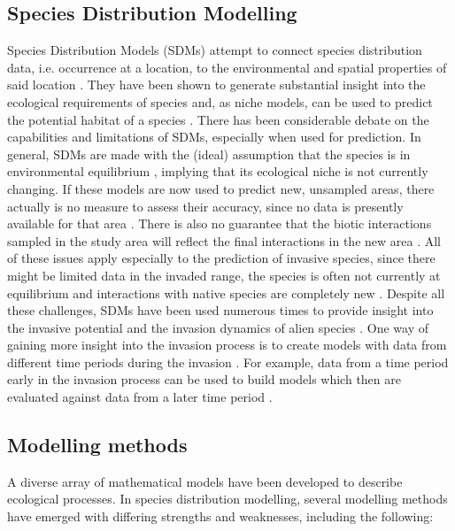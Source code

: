\documentclass[12pt,a4paper]{article}
\begin{document}
\subsection{Species Distribution Modelling}
Species Distribution Models (SDMs) attempt to connect species distribution data, i.e. occurrence at a location, to the environmental and spatial properties of said location \cite{elith2009sdmtheory}.
They have been shown to generate substantial insight into the ecological requirements of species and, as niche models, can be used to predict the potential habitat of a species \cite{araujo2006sdmchallenges}.
There has been considerable debate on the capabilities and limitations of SDMs, especially when used for prediction.
In general, SDMs are made with the (ideal) assumption that the species is in environmental equilibrium \cite{elith2009sdmtheory}, implying that its ecological niche is not currently changing.
If these models are now used to predict new, unsampled areas, there actually is no measure to assess their accuracy, since no data is presently available for that area \cite{araujo2006sdmchallenges}.
There is also no guarantee that the biotic interactions sampled in the study area will reflect the final interactions in the new area \cite{elith2009sdmtheory}.
All of these issues apply especially to the prediction of invasive species, since there might be limited data in the invaded range, the species is often not currently at equilibrium and interactions with native species are completely new \cite{mainali2015sdmprojecting}.
Despite all these challenges, SDMs have been used numerous times to provide insight into the invasive potential and the invasion dynamics of alien species \cite{zimmermann2010sdmtrends}.
One way of gaining more insight into the invasion process is to create models with data from different time periods during the invasion \cite{briscoe2019palmerisdm}.
For example, data from a time period early in the invasion process can be used to build models which then are evaluated against data from a later time period \cite{barbet2018nigrithoraxsdm}.

\subsection{Modelling methods}
A diverse array of mathematical models have been developed to describe ecological processes.
In species distribution modelling, several modelling methods have emerged with differing strengths and weaknesses, including the following:
\end{document}
